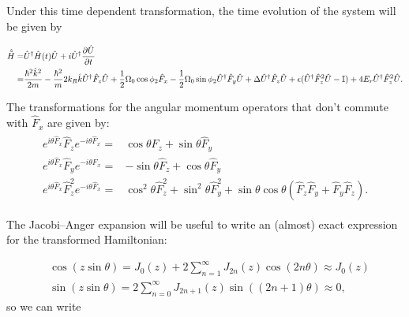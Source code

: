 Under this time dependent transformation, the time evolution of the system will be given by
%

\begin{align}
\begin{split}
\hat{\tilde{H}} = & \hat{U}^{\dagger}\hat{H}(t)\hat{U} + i\hat{U}^{\dagger} \frac{\partial\hat{U}}{\partial t} \\
=  &\frac{\hbar^2\hat{k}^2}{2m} - \frac{\hbar^2}{m}2{{k_R}}\hat{k}\hat{U}^{\dagger}\hat{F}_z\hat{U} + \frac{1}{2}\Omega_0\cos\phi_2\hat{F}_x - \frac{1}{2}\Omega_0\sin\phi_2\hat{U}^{\dagger}\hat{F}_y\hat{U} + \Delta\hat{U}^{\dagger}\hat{F}_z\hat{U} + \epsilon(\hat{U}^{\dagger}\hat{F}_z^2\hat{U}-\mathbb{I})+4E_r \hat{U}^{\dagger}\hat{F}_z^2\hat{U}.
\end{split}
\end{align}

The transformations for the angular momentum operators that don't commute with $\hat{F}_x$ are given by: 
%
\begin{align}
\begin{split}
e^{i\theta \hat{F}_x} \hat{F}_z e^{-i\theta \hat{F}_x}=& \cos\theta \hat{F}_z + \sin\theta\hat{F}_y \\
e^{i\theta \hat{F}_x} \hat{F}_y e^{-i\theta \hat{F}_x} =& -\sin\theta\hat{F}_z +\cos\theta\hat{F}_y \\
e^{i\theta \hat{F}_x} \hat{F}_z^2 e^{-i\theta \hat{F}_x} = &\cos^2\theta\hat{F}_z^2+\sin^2\theta\hat{F}_y^2 + \sin\theta\cos\theta(\hat{F}_z\hat{F}_y + \hat{F}_y\hat{F}_z).
\end{split}
\end{align}

The Jacobi–Anger expansion will be useful to write an (almost) exact expression for the transformed Hamiltonian:

\begin{align}
&\cos(z\sin\theta)= J_0(z) + 2\sum_{n=1}^{\infty}J_{2n}(z)\cos(2n\theta) \approx J_0(z) \\
&\sin(z\sin\theta)= 2\sum_{n=0}^{\infty}J_{2n+1}(z)\sin((2n+1)\theta) \approx 0,
\end{align} 
%
%
so we can write

